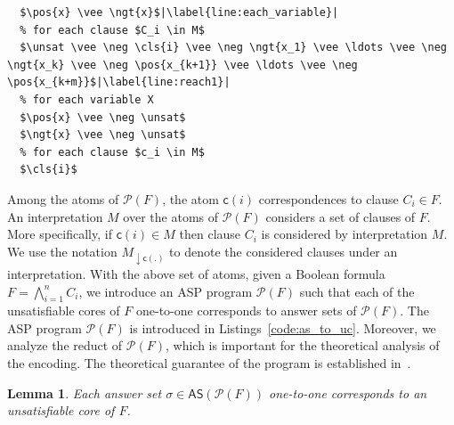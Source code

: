 \documentclass{article}
\newtheorem{lemma}{Lemma}
\newcommand{\unsat}{\ensuremath{\mathsf{unsat}}}
\newcommand{\pos}[1]{\ensuremath{\mathsf{pos}(#1)}}
\newcommand{\ngt}[1]{\ensuremath{\mathsf{neg}(#1)}}
\newcommand{\cls}[1]{\ensuremath{\mathsf{c}(#1)}}
\newcommand{\program}[1]{\mathcal{P}(#1)}
\newcommand{\answer}[1]{\mathsf{AS}(#1)}
\begin{document}
\begin{lstlisting}[caption={Reduct of $\program{F}$ w.r.t. $M$},label={code:program_to_reduct},captionpos=b,mathescape=true,escapechar=|,float]
  % for each variable $x \in X$
  $\pos{x} \vee \ngt{x}$|\label{line:each_variable}|
  % for each clause $C_i \in M$
  $\unsat \vee \neg \cls{i} \vee \neg \ngt{x_1} \vee \ldots \vee \neg \ngt{x_k} \vee \neg \pos{x_{k+1}} \vee \ldots \vee \neg \pos{x_{k+m}}$|\label{line:reach1}|
  % for each variable X
  $\pos{x} \vee \neg \unsat$
  $\ngt{x} \vee \neg \unsat$
  % for each clause $c_i \in M$
  $\cls{i}$
\end{lstlisting}
Among the atoms of $\program{F}$, the atom $\cls{i}$ correspondences to clause $C_i \in F$. 
An interpretation $M$ over the atoms of $\program{F}$ considers a set of clauses of $F$.
More specifically, if $\cls{i} \in M$ then clause $C_i$ is considered by interpretation $M$.
We use the notation $M_{\downarrow \cls{.}}$ to denote the considered clauses under an interpretation. 
With the above set of atoms, given a Boolean formula $F = \bigwedge_{i=1}^{n} C_i$, we introduce an ASP program $\program{F}$ such that each of the unsatisfiable cores of $F$ one-to-one corresponds to answer sets of $\program{F}$. 
The ASP program $\program{F}$ is introduced in Listings~\ref{code:as_to_uc}. 
Moreover, we analyze the reduct of $\program{F}$, which is important for the theoretical analysis of the encoding. The theoretical guarantee of the program is established in~.
\begin{lemma}
  \label{lemma:as_to_uc_proof}
  Each answer set $\sigma \in \answer{\program{F}}$ one-to-one corresponds to an unsatisfiable core of $F$.
\end{lemma}
\end{document}
